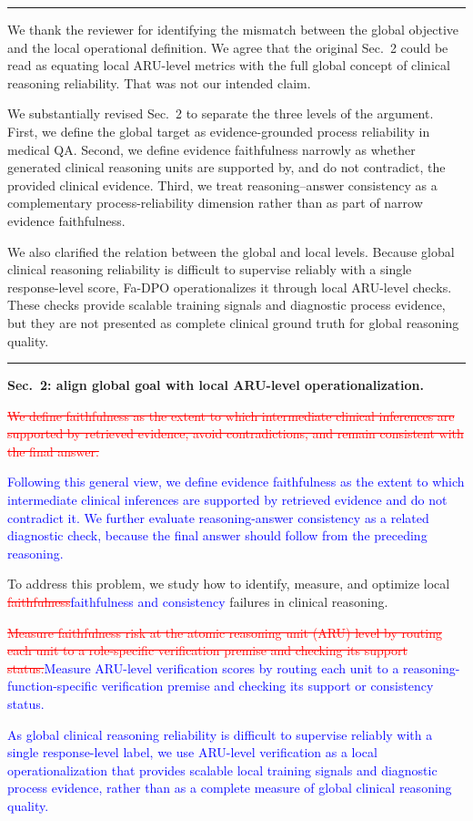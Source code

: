 \documentclass[12pt]{article}
\newcommand{\deleted}[1]{\textcolor{red}{\sout{#1}}}
\newcommand{\added}[1]{\textcolor{blue}{#1}}
\newcommand{\responseheading}[1]{%
    \vspace{0.24cm}
    \par\noindent{\large\bfseries #1}\par
    \vspace{0.03cm}
    \noindent\rule{\linewidth}{0.35pt}\par
    \vspace{0.06cm}
    \noindent\ignorespaces
}
\begin{document}
\responseheading{Response and Revision Summary}
We thank the reviewer for identifying the mismatch between the global objective and
the local operational definition. We agree that the original Sec.~2 could be read as
equating local ARU-level metrics with the full global concept of clinical reasoning
reliability. That was not our intended claim.

We substantially revised Sec.~2 to separate the three levels of the argument. First,
we define the global target as evidence-grounded process reliability in medical QA.
Second, we define evidence faithfulness narrowly as whether generated clinical
reasoning units are supported by, and do not contradict, the provided clinical
evidence. Third, we treat reasoning--answer consistency as a complementary
process-reliability dimension rather than as part of narrow evidence faithfulness.

We also clarified the relation between the global and local levels. Because global
clinical reasoning reliability is difficult to supervise reliably with a single
response-level score, Fa-DPO operationalizes it through local ARU-level checks. These
checks provide scalable training signals and diagnostic process evidence, but they
are not presented as complete clinical ground truth for global reasoning quality.


\responseheading{Revision Details}
\textbf{Sec.~2: align global goal with local ARU-level operationalization.}
\begin{displayquote}
\deleted{We define faithfulness as the extent to which intermediate clinical inferences are supported by retrieved evidence, avoid contradictions, and remain consistent with the final answer.}

\added{Following this general view, we define evidence faithfulness as the extent to which intermediate clinical inferences are supported by retrieved evidence and do not contradict it. We further evaluate reasoning-answer consistency as a related diagnostic check, because the final answer should follow from the preceding reasoning.}

To address this problem, we study how to identify, measure, and optimize local \deleted{faithfulness}\added{faithfulness and consistency} failures in clinical reasoning.

\deleted{Measure faithfulness risk at the atomic reasoning unit (ARU) level by routing each unit to a role-specific verification premise and checking its support status.}\added{Measure ARU-level verification scores by routing each unit to a reasoning-function-specific verification premise and checking its support or consistency status.}

\added{As global clinical reasoning reliability is difficult to supervise reliably with a single response-level label, we use ARU-level verification as a local operationalization that provides scalable local training signals and diagnostic process evidence, rather than as a complete measure of global clinical reasoning quality.}
\end{displayquote}
\end{document}
